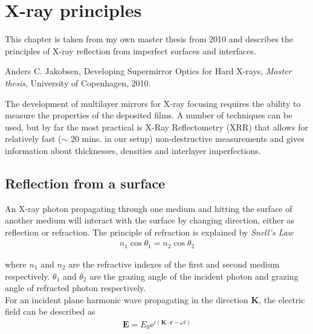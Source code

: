 \chapter{X-ray principles}\label{chap:xray_appendix}
\renewcommand{\papertitle}{X-ray principles}
\markboth{}{}
This chapter is taken from my own master thesis from 2010 and describes the principles of X-ray reflection from imperfect surfaces and interfaces.

Anders C. Jakobsen, Developing Supermirror Optics for Hard X-rays, \emph{Master thesis}, University of Copenhagen, 2010.

\newpage\mbox{} %
\markboth{\papertitle}{}

The development of multilayer mirrors for X-ray focusing requires the ability to measure the properties of the deposited films. A number of techniques can be used, but by far the most practical is X-Ray Reflectometry (XRR) that allows for relatively fast ($\sim$ 20 mins. in our setup) non-destructive measurements and gives information about thicknesses, densities and interlayer imperfections.

\section{Reflection from a surface}
An X-ray photon propagating through one medium and hitting the surface of another medium will interact with the surface by changing direction, either as reflection or refraction. The principle of refraction is explained by \emph{Snell's Law}
\begin{eqnarray}
	n_1 \cos{\theta_1} = n_2 \cos{\theta_2}
\end{eqnarray}

where $n_1$ and $n_2$ are the refractive indexes of the first and second medium respectively. $\theta_1$ and $\theta_2$ are the grazing angle of the incident photon and grazing angle of refracted photon respectively.\\

For an incident plane harmonic wave propagating in the direction $\mathbf{K}$, the electric field can be described as
\begin{eqnarray}
	\mathbf{E} = E_0 \mathrm{e}^{i(\mathbf{K}\cdot \mathbf{r}-\omega t)}
\end{eqnarray}

